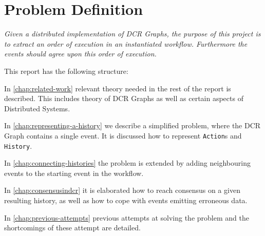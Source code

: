 \section{Problem Definition} %
	\textit{Given a distributed implementation of DCR Graphs, the purpose of this project is to extract an order of execution in an instantiated workflow. Furthermore the events should agree upon this order of execution.}
	
	\vspace{1cm}
	
	\newpar
	This report has the following structure:
	
	\newpar
	In \autoref{chap:related-work} relevant theory needed in the rest of the report is described. This includes theory of DCR Graphs as well as certain aspects of Distributed Systems. 
	
	\newpar
	In \autoref{chap:representing-a-history} we describe a simplified problem, where the DCR Graph contains a single event. It is discussed how to represent \texttt{Action}s and \texttt{History}. 
	
	\newpar
	In \autoref{chap:connecting-histories} the problem is extended by adding neighbouring events to the starting event in the workflow. 
	
	\newpar
	In \autoref{chap:consensusindcr} it is elaborated how to reach consensus on a given resulting history, as well as how to cope with events emitting erroneous data.
	
	\newpar
	In \autoref{chap:previous-attempts} previous attempts at solving the problem and the shortcomings of these attempt are detailed. 
		
	